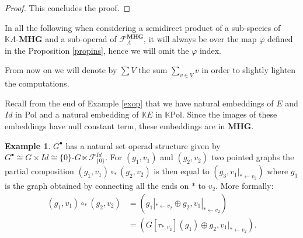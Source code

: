 \documentclass[a4paper]{article}
\theoremstyle{definition}
\newtheorem{example}[definition]{Example}
\newcommand{\K}{\mathbb{K}}
\newcommand{\MHG}{\mathbf{MHG}}
\begin{document}
\begin{proof}
This concludes the proof.
\end{proof}

In all the following when considering a semidirect product of a sub-species 
of $\K A\text{-}\MHG$ and a sub-operad of $\mathcal{F}_A^{\MHG}$, it will 
always be over the map $\varphi$ defined in the Proposition \ref{propins}, 
hence we will omit the $\varphi$ index.

From now on we will denote by $\sum V$ the sum $\sum_{v\in V} v$ in order 
to slightly lighten the computations.

Recall from the end of Example \ref{exop} that we have natural embeddings of 
$E$ and $Id$ in $\text{Pol}$ and a natural embedding of $\K E$ in $\K\text{Pol}$. 
Since the images of these embeddings have null constant term, these embeddings are in $\MHG$.
\begin{example}
 $G^{\bullet}$ has a natural set operad structure given by 
$G^{\bullet} \cong G\times Id \cong \{0\}\text{-}G\ltimes\mathcal{F}_{\{0\}}^{Id}$.
 For $(g_1,v_1)$ and $(g_2,v_2)$ two pointed graphs the partial composition 
 $(g_1,v_1)\circ_{\ast} (g_2,v_2)$ is then equal to $(g_3,v_1|_{\ast\leftarrow v_2})$ 
 where $g_3$ is the graph obtained by connecting all the ends on $\ast$ to $v_2$. More formally:
\begin{equation}\begin{split}
(g_1,v_1)\circ_{\ast} (g_2,v_2) &= (g_1|_{\ast\leftarrow v_2}\oplus g_2, v_1|_{\ast\leftarrow v_2}) \\
&= (G[\tau_{\ast,v_2}](g_1)\oplus g_2,v_1|_{\ast\leftarrow v_2}).
\end{split}\end{equation}
\begin{figure}[htbp]
\begin{center}

\end{center}
\end{figure}
\end{example}
\end{document}
